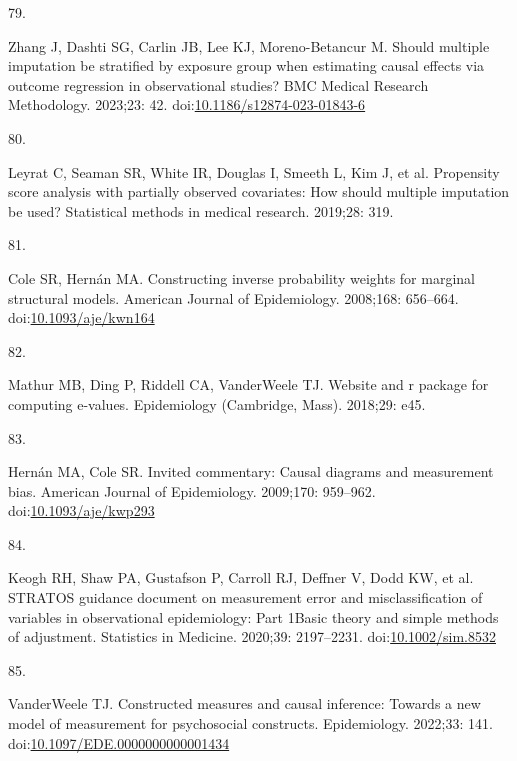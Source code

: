 \documentclass[
  singlecolumn]{article}
\newlength{\cslhangindent}
\newlength{\csllabelwidth}
\newlength{\cslentryspacingunit} %
\newenvironment{CSLReferences}[2] %
 {%
  \setlength{\parindent}{0pt}
  \ifodd #1
  \let\oldpar\par
  \def\par{\hangindent=\cslhangindent\oldpar}
  \fi
  \setlength{\parskip}{#2\cslentryspacingunit}
 }%
 {}
\newcommand{\CSLLeftMargin}[1]{\parbox[t]{\csllabelwidth}{#1}}
\newcommand{\CSLRightInline}[1]{\parbox[t]{\linewidth - \csllabelwidth}{#1}\break}
\begin{document}
\begin{CSLReferences}{0}{0}
\leavevmode{}%
\CSLLeftMargin{79. }%
\CSLRightInline{Zhang J, Dashti SG, Carlin JB, Lee KJ, Moreno-Betancur
M. Should multiple imputation be stratified by exposure group when
estimating causal effects via outcome regression in observational
studies? BMC Medical Research Methodology. 2023;23: 42.
doi:\href{https://doi.org/10.1186/s12874-023-01843-6}{10.1186/s12874-023-01843-6}}

\leavevmode{}%
\CSLLeftMargin{80. }%
\CSLRightInline{Leyrat C, Seaman SR, White IR, Douglas I, Smeeth L, Kim
J, et al. Propensity score analysis with partially observed covariates:
How should multiple imputation be used? Statistical methods in medical
research. 2019;28: 319. }

\leavevmode{}%
\CSLLeftMargin{81. }%
\CSLRightInline{Cole SR, Hernán MA. Constructing inverse probability
weights for marginal structural models. American Journal of
Epidemiology. 2008;168: 656--664.
doi:\href{https://doi.org/10.1093/aje/kwn164}{10.1093/aje/kwn164}}

\leavevmode{}%
\CSLLeftMargin{82. }%
\CSLRightInline{Mathur MB, Ding P, Riddell CA, VanderWeele TJ. Website
and r package for computing e-values. Epidemiology (Cambridge, Mass).
2018;29: e45. }

\leavevmode{}%
\CSLLeftMargin{83. }%
\CSLRightInline{Hernán MA, Cole SR. Invited commentary: Causal diagrams
and measurement bias. American Journal of Epidemiology. 2009;170:
959--962.
doi:\href{https://doi.org/10.1093/aje/kwp293}{10.1093/aje/kwp293}}

\leavevmode{}%
\CSLLeftMargin{84. }%
\CSLRightInline{Keogh RH, Shaw PA, Gustafson P, Carroll RJ, Deffner V,
Dodd KW, et al. STRATOS guidance document on measurement error and
misclassification of variables in observational epidemiology: Part
1{\textemdash}Basic theory and simple methods of adjustment. Statistics
in Medicine. 2020;39: 2197--2231.
doi:\href{https://doi.org/10.1002/sim.8532}{10.1002/sim.8532}}

\leavevmode{}%
\CSLLeftMargin{85. }%
\CSLRightInline{VanderWeele TJ. Constructed measures and causal
inference: Towards a new model of measurement for psychosocial
constructs. Epidemiology. 2022;33: 141.
doi:\href{https://doi.org/10.1097/EDE.0000000000001434}{10.1097/EDE.0000000000001434}}


\end{CSLReferences}
\end{document}
